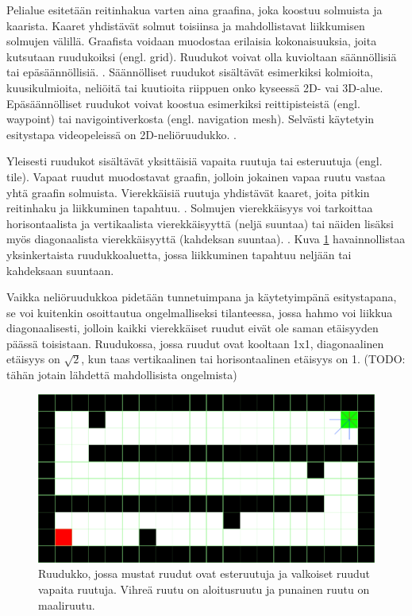 \documentclass[utf8]{gradu3}
\begin{document}
Pelialue esitetään reitinhakua varten aina graafina, joka koostuu solmuista ja kaarista. Kaaret yhdistävät solmut toisiinsa ja mahdollistavat liikkumisen solmujen välillä. Graafista voidaan muodostaa erilaisia kokonaisuuksia, joita kutsutaan ruudukoiksi (engl. grid). Ruudukot voivat olla kuvioltaan säännöllisiä tai epäsäännöllisiä. \parencite{lawande2022systematic}. Säännölliset ruudukot sisältävät esimerkiksi kolmioita, kuusikulmioita, neliöitä tai kuutioita riippuen onko kyseessä 2D- vai 3D-alue. Epäsäännölliset ruudukot voivat koostua esimerkiksi reittipisteistä (engl. waypoint) tai navigointiverkosta (engl. navigation mesh). Selvästi käytetyin esitystapa videopeleissä on 2D-neliöruudukko. \parencite{lawande2022systematic}.

Yleisesti ruudukot sisältävät yksittäisiä vapaita ruutuja tai esteruutuja (engl. tile). Vapaat ruudut muodostavat graafin, jolloin jokainen vapaa ruutu vastaa yhtä graafin solmuista. Vierekkäisiä ruutuja yhdistävät kaaret, joita pitkin reitinhaku ja liikkuminen tapahtuu. \parencite{botea2013pathfinding}. Solmujen vierekkäisyys voi tarkoittaa horisontaalista ja vertikaalista vierekkäisyyttä (neljä suuntaa) tai näiden lisäksi myös diagonaalista vierekkäisyyttä (kahdeksan suuntaa). \parencite{abd2015comprehensive,botea2013pathfinding}. Kuva \ref{ruudukkokuva} havainnollistaa yksinkertaista ruudukkoaluetta, jossa liikkuminen tapahtuu neljään tai kahdeksaan suuntaan.

Vaikka neliöruudukkoa pidetään tunnetuimpana ja käytetyimpänä esitystapana, se voi kuitenkin osoittautua ongelmalliseksi tilanteessa, jossa hahmo voi liikkua diagonaalisesti, jolloin kaikki vierekkäiset ruudut eivät ole saman etäisyyden päässä toisistaan. Ruudukossa, jossa ruudut ovat kooltaan 1x1, diagonaalinen etäisyys on $\sqrt{2}$, kun taas vertikaalinen tai horisontaalinen etäisyys on 1. (TODO: tähän jotain lähdettä mahdollisista ongelmista)

\begin{figure}[h]
\centering
\includegraphics[width=15cm]{ruudukko_kuva.png}
\caption{Ruudukko, jossa mustat ruudut ovat esteruutuja ja valkoiset ruudut vapaita ruutuja. Vihreä ruutu on aloitusruutu ja punainen ruutu on maaliruutu.}
\label{ruudukkokuva}
\end{figure}
\end{document}
